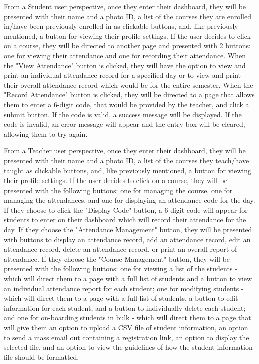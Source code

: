 \documentclass[letterpaper,12pt,oneside,listof=totoc]{scrreprt}
\begin{document}
From a Student user perspective, once they enter their dashboard, they will be presented with their name and a photo ID, a list of the courses they are enrolled in/have been previously enrolled in as clickable buttons, and, like previously mentioned, a button for viewing their profile settings. If the user decides to click on a course, they will be directed to another page and presented with 2 buttons: one for viewing their attendance and one for recording their attendance. When the "View Attendance" button is clicked, they will have the option to view and print an individual attendance record for a specified day or to view and print their overall attendance record which would be for the entire semester. When the "Record Attendance" button is clicked, they will be directed to a page that allows them to enter a 6-digit code, that would be provided by the teacher, and click a submit button. If the code is valid, a success message will be displayed. If the code is invalid, an error message will appear and the entry box will be cleared, allowing them to try again.

From a Teacher user perspective, once they enter their dashboard, they will be presented with their name and a photo ID, a list of the courses they teach/have taught as clickable buttons, and, like previously mentioned, a button for viewing their profile settings. If the user decides to click on a course, they will be presented with the following buttons: one for managing the course, one for managing the attendances, and one for displaying an attendance code for the day. If they choose to click the "Display Code" button, a 6-digit code will appear for students to enter on their dashboard which will record their attendance for the day. If they choose the "Attendance Management" button, they will be presented with buttons to display an attendance record, add an attendance record, edit an attendance record, delete an attendance record, or print an overall report of attendance. If they choose the "Course Management" button, they will be presented with the following buttons: one for viewing a list of the students - which will direct them to a page with a full list of students and a button to view an individual attendance report for each student; one for modifying students - which will direct them to a page with a full list of students, a button to edit information for each student, and a button to individually delete each student; and one for on-boarding students in bulk - which will direct them to a page that will give them an option to upload a CSV file of student information, an option to send a mass email out containing a registration link, an option to display the selected file, and an option to view the guidelines of how the student information file should be formatted.
\end{document}
